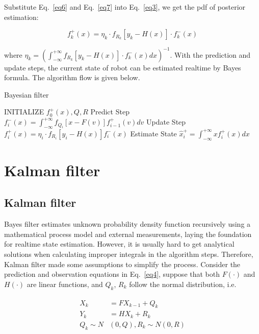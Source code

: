 \documentclass[conference]{IEEEtran}
\begin{document}
	Substitute Eq.~\ref{eq6} and Eq.~\ref{eq7} into Eq.~\ref{eq3}, we get the pdf of posterior estimation:
	
	\begin{equation}
		f_{k}^{+}(x)=\eta_{k} \cdot f_{R_{k}}[y_{k}-H(x)]\cdot f_{k}^{-}(x)
		\label{eq8}
	\end{equation}
	
	where $\eta_{k} = (\int_{-\infty}^{+\infty}f_{R_{k}}[y_{k}-H(x)]\cdot f_{k}^{-}(x)dx)^{-1}$. With the prediction and update steps, the current state of robot can be estimated realtime by Bayes formula. The algorithm flow is given below.

	
	\begin{algorithm}
		\caption{Bayesian filter}
		
		\begin{algorithmic}  
			\STATE INITIALIZE $f_{0}^{+}(x), Q, R$
			\STATE Predict Step
			$f_{i}^{-}(x)=\int_{-\infty}^{+\infty}f_{Q_{i}}[x-F(v)]f_{i-1}^{+}(v)dv$
			\STATE Update Step
			$f_{i}^{+}(x)=\eta_{i}\cdot f_{R_{i}}[y_{i}-H(x)]f_{i}^{-}(x)$
			\STATE Estimate State $\hat{x}_{i}^{+}=\int_{-\infty}^{+\infty}xf_{i}^{+}(x)dx$
			\ENDFOR
		\end{algorithmic}
	\end{algorithm}
	
	\section{Kalman filter}
	
	\subsection{Kalman filter}
	
	Bayes filter estimates unknown probability density function recursively using a mathematical process model and external measurements, laying the foundation for realtime state estimation. However, it is usually hard to get analytical solutions when calculating improper integrals in the algorithm steps. Therefore, Kalman filter made some assumptions to simplify the process. Consider the prediction and observation equations in Eq.~\ref{eq4}, suppose that both $F(\cdot)$ and $H(\cdot)$ are linear functions, and $Q_{k}$, $R_{k}$ follow the normal distribution, i.e.
	
	\begin{equation}
	\begin{split}
	\begin{aligned}
	X_{k}&=FX_{k-1}+Q_{k}\\
	Y_{k}&=HX_{k}+R_{k}\\
	Q_{k}\sim N&(0,Q), R_{k}\sim N(0,R)
	\label{eq9}
	\end{aligned}
	\end{split}
	\end{equation}
	
\end{document}
